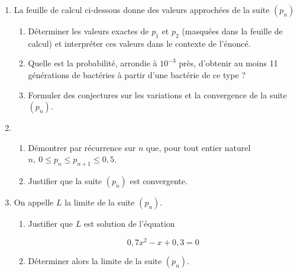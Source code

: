 \documentclass[10pt,a4paper]{article}
\begin{document}
\begin{minipage}{0.68\linewidth}
\begin{enumerate}
\item La feuille de calcul ci-dessous donne des valeurs approchées de la suite $\left(p_n\right)$
	\begin{enumerate}
		\item Déterminer les valeurs exactes de $p_1$ et $p_2$ (masquées dans la feuille de calcul) et interpréter ces valeurs dans le contexte de l'énoncé.
		\item Quelle est la probabilité, arrondie à $10^{-3}$ près, d'obtenir au moins 11 générations de bactéries à partir d'une bactérie de ce type ?
		\item Formuler des conjectures sur les variations et la convergence de la suite $\left(p_n\right)$.
	\end{enumerate}
\item 
	\begin{enumerate}
		\item Démontrer par récurrence sur $n$ que,
pour tout entier naturel $n,\: 0 \leqslant p_n \leqslant p_{n+1} \leqslant0,5$.
		\item Justifier que la suite $\left(p_n\right)$ est convergente.
	\end{enumerate}
\item On appelle $L$ la limite de la suite $\left(p_n\right)$.
	\begin{enumerate}
		\item Justifier que $L$ est solution de l'équation 
		
		\[0,7x^2 - x  + 0,3 = 0\]
		\item Déterminer alors la limite de la suite $\left(p_n\right)$.
	\end{enumerate}
\end{enumerate}
\end{minipage}\hfill
\end{document}
